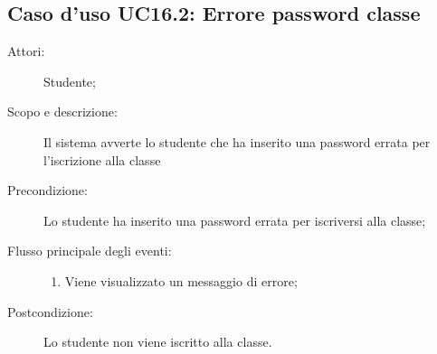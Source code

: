 \subsection{Caso d'uso UC16.2: Errore password classe}\begin{description}
\item[Attori:] Studente;
\item[Scopo e descrizione:] Il sistema avverte lo studente che ha inserito una password errata per l'iscrizione alla classe
      \item[Precondizione:] Lo studente ha inserito una password errata per iscriversi alla classe;

        \item[Flusso principale degli eventi:] \begin{enumerate}
          \item Viene visualizzato un messaggio di errore;

      \end{enumerate}
    \item[Postcondizione:] Lo studente non viene iscritto alla classe.
  \end{description}
\hypertarget{UC17}{}
